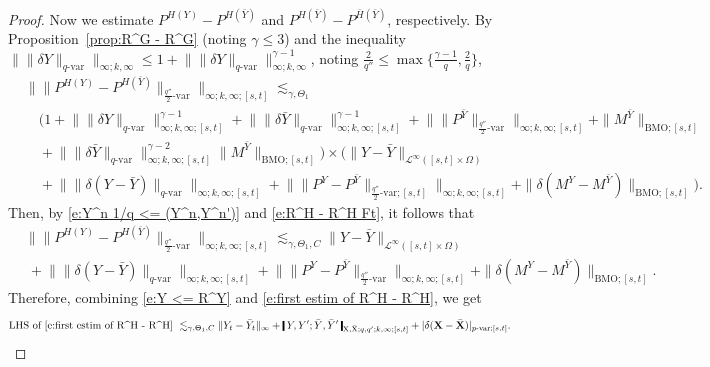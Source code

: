 \documentclass[11pt,reqno]{amsart}
\numberwithin{equation}{section}
\newcommand{\shortthickbar}{%
  \vcenter{\hbox{\rule{1.8pt}{2.2ex}}}%
}
\newcommand{\thicknm}[1]{%
  \mathopen{\shortthickbar}%
  \mkern4mu #1 \mkern4mu%
  \mathclose{\shortthickbar}%
}
\begin{document}
\begin{proof}
Now we estimate $P^{H(Y)} - P^{H(\bar Y)}$  and $P^{H(\bar Y)} - P^{\bar H(\bar Y)}$, respectively. By Proposition~\ref{prop:R^G - R^G} (noting $\gamma \le 3$) and the inequality $\big\| \|\delta Y\|_{q\text{-}\mathrm{var}} \big\|_{\infty;k,\infty} \le 1 + \big\| \|\delta Y\|_{q\text{-}\mathrm{var}} \big\|^{\gamma - 1}_{\infty;k,\infty}$, noting $\frac{2}{q''} \le \max\{\frac{\gamma - 1}{q}, \frac{2}{q}\}$, 
\begin{align}\nonumber 
&\big\| \|P^{H(Y)} - P^{H(\bar Y)}\|_{\frac{q''}{2}\text{-}\mathrm{var}} \big\|_{\infty;k,\infty;[s,t]} \lesssim_{\gamma,\Theta_1} \\ \nonumber 
&\quad \Big( 1 + \big\| \|\delta Y\|_{q\text{-}\mathrm{var}} \big\|^{\gamma - 1}_{\infty;k,\infty;[s,t]} + \big\| \|\delta \bar Y\|_{q\text{-}\mathrm{var}} \big\|^{\gamma - 1}_{\infty;k,\infty;[s,t]} + \big\| \|P^{\bar Y}\|_{\frac{q''}{2}\text{-}\mathrm{var}} \big\|_{\infty;k,\infty;[s,t]} + \|M^{\bar Y}\|_{\mathrm{BMO};[s,t]} \\ \label{e:R^H - R^H Ft} 
&\quad + \big\| \|\delta \bar Y\|_{q\text{-}\mathrm{var}} \big\|^{\gamma - 2}_{\infty;k,\infty;[s,t]} \|M^{\bar Y}\|_{\mathrm{BMO};[s,t]} \Big) \times \Big( \|Y - \bar Y\|_{\mathcal L^{\infty}([s,t] \times \Omega)}    \\ \nonumber 
&\quad + \big\| \|\delta (Y - \bar Y)\|_{q\text{-}\mathrm{var}} \big\|_{\infty;k,\infty;[s,t]} + \big\| \|P^Y - P^{\bar Y}\|_{\frac{q''}{2}\text{-}\mathrm{var};[s,t]} \big\|_{\infty;k,\infty;[s,t]} + \|\delta (M^Y - M^{\bar Y})\|_{\mathrm{BMO};[s,t]} \Big).
\end{align}
Then, by \eqref{e:Y^n 1/q <= (Y^n,Y^n')} and \eqref{e:R^H - R^H Ft}, it follows that 
\begin{align}\label{e:first estim of R^H - R^H}
&\big\| \|P^{H(Y)} - P^{H(\bar Y)}\|_{\frac{q''}{2}\text{-}\mathrm{var}} \big\|_{\infty;k,\infty;[s,t]}  
\lesssim_{\gamma,\Theta_{1},C} \|Y - \bar Y\|_{\mathcal L^{\infty}([s,t] \times \Omega)} \\ \nonumber 
&\ + \big\| \|\delta (Y - \bar Y)\|_{q\text{-}\mathrm{var}} \big\|_{\infty;k,\infty;[s,t]} + \big\| \|P^Y - P^{\bar Y}\|_{\frac{q''}{2}\text{-}\mathrm{var}} \big\|_{\infty;k,\infty;[s,t]} + \|\delta (M^Y - M^{\bar Y})\|_{\mathrm{BMO};[s,t]}. 
\end{align}
Therefore, combining \eqref{e:Y <= R^Y} and \eqref{e:first estim of R^H - R^H}, we get 
\begin{equation}\label{e:R^H - R^H Ft'}
\text{LHS of \eqref{e:first estim of R^H - R^H} } \lesssim_{\gamma,\Theta_1,C} \|Y_t - \bar Y_t\|_{\infty} + \thicknm{Y ,Y'; \bar Y, \bar Y'}_{\mathrm X,\bar{\mathrm X};q,q';k,\infty;[s,t]} + |\delta (\mathbf X - \bar{\mathbf X} )|_{p\text{-}\mathrm{var};[s,t]}.

\end{equation}
\end{proof}
\end{document}
